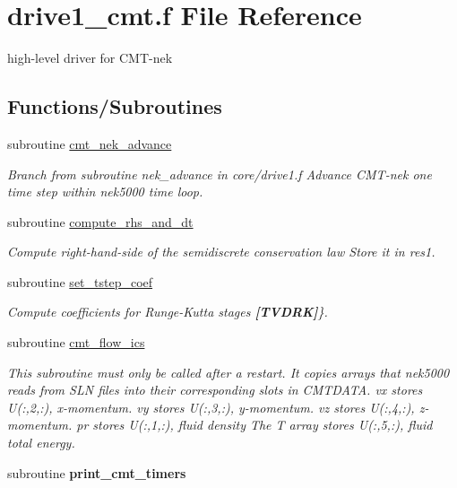 \hypertarget{drive1__cmt_8f}{\section{drive1\-\_\-cmt.\-f File Reference}
\label{drive1__cmt_8f}
}


high-\/level driver for C\-M\-T-\/nek  


\subsection*{Functions/\-Subroutines}
\begin{DoxyCompactItemize}
\item 
subroutine \hyperlink{drive1__cmt_8f_af21718debad3a2fefd68afcc5991813a}{cmt\-\_\-nek\-\_\-advance}
\begin{DoxyCompactList}\small\item\em Branch from subroutine nek\-\_\-advance in core/drive1.\-f Advance C\-M\-T-\/nek one time step within nek5000 time loop. \end{DoxyCompactList}\item 
subroutine \hyperlink{drive1__cmt_8f_a001e854c71bfa7c25b504caaa09b7681}{compute\-\_\-rhs\-\_\-and\-\_\-dt}
\begin{DoxyCompactList}\small\item\em Compute right-\/hand-\/side of the semidiscrete conservation law Store it in res1. \end{DoxyCompactList}\item 
\hypertarget{drive1__cmt_8f_a682c25d68683aaedd6aa5c7e7cd166ed}{subroutine \hyperlink{drive1__cmt_8f_a682c25d68683aaedd6aa5c7e7cd166ed}{set\-\_\-tstep\-\_\-coef}}\label{drive1__cmt_8f_a682c25d68683aaedd6aa5c7e7cd166ed}

\begin{DoxyCompactList}\small\item\em Compute coefficients for Runge-\/\-Kutta stages {\bfseries [T\-V\-D\-R\-K]}\}. \end{DoxyCompactList}\item 
\hypertarget{drive1__cmt_8f_a0a2e4794cb7239611d23502b7c312feb}{subroutine \hyperlink{drive1__cmt_8f_a0a2e4794cb7239611d23502b7c312feb}{cmt\-\_\-flow\-\_\-ics}}\label{drive1__cmt_8f_a0a2e4794cb7239611d23502b7c312feb}

\begin{DoxyCompactList}\small\item\em This subroutine must only be called after a restart. It copies arrays that nek5000 reads from S\-L\-N files into their corresponding slots in C\-M\-T\-D\-A\-T\-A. vx stores U(\-:,2,\-:), x-\/momentum. vy stores U(\-:,3,\-:), y-\/momentum. vz stores U(\-:,4,\-:), z-\/momentum. pr stores U(\-:,1,\-:), fluid density The T array stores U(\-:,5,\-:), fluid total energy. \end{DoxyCompactList}\item 
\hypertarget{drive1__cmt_8f_a2d3a6bf3ca463bb62525dd09836d5c43}{subroutine {\bfseries print\-\_\-cmt\-\_\-timers}}\label{drive1__cmt_8f_a2d3a6bf3ca463bb62525dd09836d5c43}


\end{DoxyCompactItemize}

